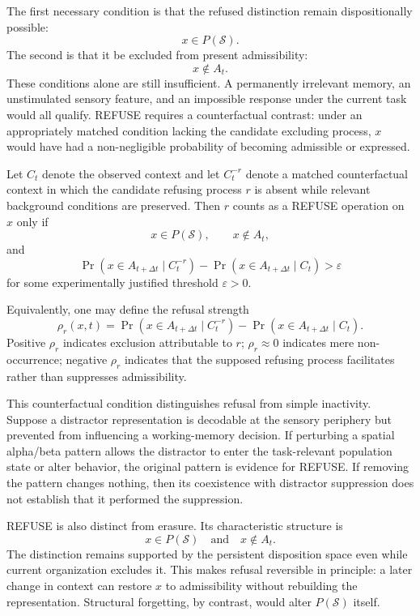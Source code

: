 \documentclass[11pt]{book}
\begin{document}
The first necessary condition is that the refused distinction remain dispositionally possible:
\[
x\in P(\mathcal S).
\]
The second is that it be excluded from present admissibility:
\[
x\notin A_t.
\]
These conditions alone are still insufficient. A permanently irrelevant memory, an unstimulated sensory feature, and an impossible response under the current task would all qualify. REFUSE requires a counterfactual contrast: under an appropriately matched condition lacking the candidate excluding process, $x$ would have had a non-negligible probability of becoming admissible or expressed.

Let $C_t$ denote the observed context and let $C_t^{-r}$ denote a matched counterfactual context in which the candidate refusing process $r$ is absent while relevant background conditions are preserved. Then $r$ counts as a REFUSE operation on $x$ only if
\[
x\in P(\mathcal S),\qquad x\notin A_t,
\]
and
\[
\Pr\!\left(x\in A_{t+\Delta t}\mid C_t^{-r}\right)
-
\Pr\!\left(x\in A_{t+\Delta t}\mid C_t\right)
>
\varepsilon
\]
for some experimentally justified threshold $\varepsilon>0$.

Equivalently, one may define the refusal strength
\[
\rho_r(x,t)
=
\Pr\!\left(x\in A_{t+\Delta t}\mid C_t^{-r}\right)
-
\Pr\!\left(x\in A_{t+\Delta t}\mid C_t\right).
\]
Positive $\rho_r$ indicates exclusion attributable to $r$; $\rho_r\approx 0$ indicates mere non-occurrence; negative $\rho_r$ indicates that the supposed refusing process facilitates rather than suppresses admissibility.

This counterfactual condition distinguishes refusal from simple inactivity. Suppose a distractor representation is decodable at the sensory periphery but prevented from influencing a working-memory decision. If perturbing a spatial alpha/beta pattern allows the distractor to enter the task-relevant population state or alter behavior, the original pattern is evidence for REFUSE. If removing the pattern changes nothing, then its coexistence with distractor suppression does not establish that it performed the suppression.

REFUSE is also distinct from erasure. Its characteristic structure is
\[
x\in P(\mathcal S)
\quad\text{and}\quad
x\notin A_t.
\]
The distinction remains supported by the persistent disposition space even while current organization excludes it. This makes refusal reversible in principle: a later change in context can restore $x$ to admissibility without rebuilding the representation. Structural forgetting, by contrast, would alter $P(\mathcal S)$ itself.
\end{document}
